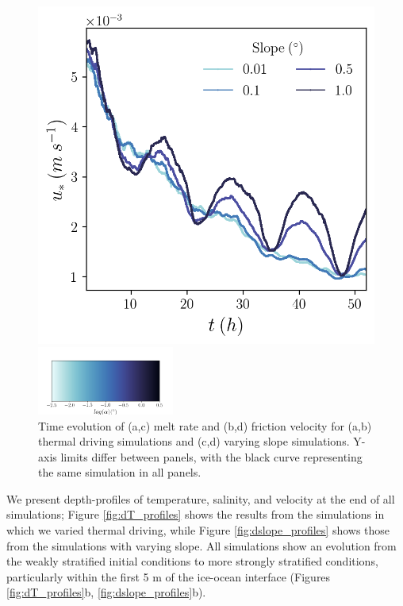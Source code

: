 \documentclass[draft]{agujournal2019}
\begin{document}
\begin{figure}[h!]
\begin{minipage}{0.4\textwidth}
        \includegraphics[trim={0 4cm 0 0},clip,width=\textwidth]{Figures/us_cmp_dslope_t.png}
    \end{minipage}
    \includegraphics[width=0.4\textwidth,trim={1cm 0cm 1cm 5cm}, clip]{Figures/colorbar_slope.png}
    \caption{Time evolution of (a,c) melt rate and (b,d) friction velocity for (a,b) thermal driving simulations and (c,d) varying slope simulations. Y-axis limits differ between panels, with the black curve representing the same simulation in all panels.}
    \label{fig:timeseries}
\end{figure}

We present depth-profiles of temperature, salinity, and velocity at the end of all simulations; Figure \ref{fig:dT_profiles} shows the results from the simulations in which we varied thermal driving, while Figure \ref{fig:dslope_profiles} shows those from the simulations with varying slope. All simulations show an evolution from the weakly stratified initial conditions to more strongly stratified conditions, particularly within the first 5 m of the ice-ocean interface (Figures \ref{fig:dT_profiles}b, \ref{fig:dslope_profiles}b). 
\end{document}
